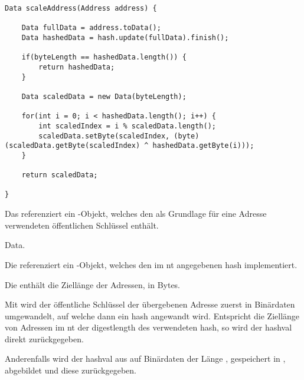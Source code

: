 \label{dcl-addr-scaling-cnet}
\javalisting
\listingneedspace
\begin{lstlisting}[caption={Adressverkürzung im \gls*{cnt} (Java)},captionpos=b]
Data scaleAddress(Address address) {

	Data fullData = address.toData();
	Data hashedData = hash.update(fullData).finish();

	if(byteLength == hashedData.length()) {
		return hashedData;
	}

	Data scaledData = new Data(byteLength);

	for(int i = 0; i < hashedData.length(); i++) {
		int scaledIndex = i % scaledData.length();
		scaledData.setByte(scaledIndex, (byte)(scaledData.getByte(scaledIndex) ^ hashedData.getByte(i)));
	}

	return scaledData;

}
\end{lstlisting}

\begin{description}

		Das \javaarg {} referenziert ein -Objekt, welches den
		als Grundlage für eine Adresse verwendeten öffentlichen Schlüssel enthält.

		\glsdesc{Data}.

		Die \javainstvar {} referenziert ein -Objekt, welches den
		im \gls{nt} angegebenen \gls{hash} implementiert.

		Die \javainstvar {} enthält die Ziellänge der Adressen, in Bytes.

\end{description}

Mit  wird der öffentliche Schlüssel der übergebenen Adresse zuerst in Binärdaten
umgewandelt, auf welche dann ein \gls{hash} angewandt wird. Entspricht die Ziellänge von Adressen im
\gls{nt} der \gls{digestlength} des verwendeten \gls{hash}, so wird der \gls{hashval} 
direkt zurückgegeben.

Anderenfalls wird der \gls{hashval} aus  auf Binärdaten der Länge ,
gespeichert in , abgebildet und diese zurückgegeben.
